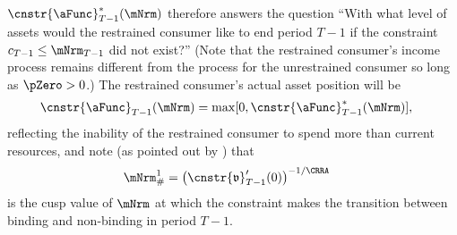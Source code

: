 \documentclass[\econtexRoot/BufferStockTheory]{subfiles}
\begin{document}
$\cnstr{\aFunc}_{T-1}^{*}(\mNrm)$ therefore answers the question ``With what level of assets would the restrained consumer like to end period $T-1$ if the constraint $c_{T-1} \leq \mNrm_{T-1}$ did not exist?''  (Note that the restrained consumer's income process remains different from the process for the unrestrained consumer so long as $\pZero>0$.)
The restrained consumer's actual asset position will be
\begin{equation}\begin{gathered}\begin{aligned}
      \cnstr{\aFunc}_{T-1}(\mNrm)  & = \max[0,\cnstr{\aFunc}^{*}_{T-1}(\mNrm)], \notag
    \end{aligned}\end{gathered}\end{equation}
reflecting the inability of the restrained consumer to spend more than current resources, and note (as pointed out by \cite{deatonLiqConstr}) that
\begin{equation}\begin{gathered}\begin{aligned}
      \mNrm^{1}_{\#}  & = {\left( \cnstr{\mathfrak{v}}_{T-1}^{\prime}(0)\right)}^{-1/\CRRA} \notag
    \end{aligned}\end{gathered}\end{equation}
is the cusp value of $\mNrm$ at which the constraint makes the
transition between binding and non-binding in period $T-1$.
\end{document}
